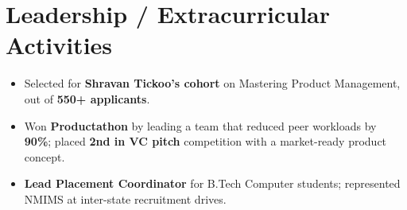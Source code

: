 \documentclass[10pt,a4paper]{article}
\begin{document}
\section*{Leadership / Extracurricular Activities}
\begin{itemize}[noitemsep]
    \item Selected for \textbf{Shravan Tickoo's cohort} on Mastering Product Management, out of \textbf{550+ applicants}.
    \item Won \textbf{Productathon} by leading a team that reduced peer workloads by \textbf{90\%}; placed \textbf{2nd in VC pitch} competition with a market-ready product concept.
    \item \textbf{Lead Placement Coordinator} for B.Tech Computer students; represented NMIMS at inter-state recruitment drives.
\end{itemize}
\end{document}
